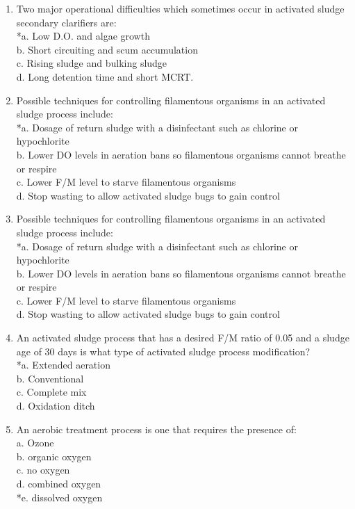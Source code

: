 \begin{enumerate}
\item Two major operational difficulties which sometimes occur in activated sludge secondary clarifiers are: \\
*a. Low D.O. and algae growth \\
b. Short circuiting and scum accumulation \\
c. Rising sludge and bulking sludge \\
d. Long detention time and short MCRT. \\


\item Possible techniques for controlling filamentous organisms in an activated sludge process include: \\
*a. Dosage of return sludge with a disinfectant such as chlorine or hypochlorite \\
b. Lower DO levels in aeration bans so filamentous organisms cannot breathe or respire \\
c. Lower F/M level to starve filamentous organisms \\
d. Stop wasting to allow activated sludge bugs to gain control \\

\item Possible techniques for controlling filamentous organisms in an activated sludge process include: \\
*a. Dosage of return sludge with a disinfectant such as chlorine or hypochlorite \\
b. Lower DO levels in aeration bans so filamentous organisms cannot breathe or respire \\
c. Lower F/M level to starve filamentous organisms \\
d. Stop wasting to allow activated sludge bugs to gain control \\

\item An activated sludge process that has a desired F/M ratio of 0.05 and a sludge age of 30 days is what type of activated sludge process modification? \\
*a. Extended aeration \\
b. Conventional \\
c. Complete mix \\
d. Oxidation ditch \\

\item An aerobic treatment process is one that requires the presence of: \\
a. Ozone \\
b. organic oxygen \\
c. no oxygen \\
d. combined oxygen \\
*e. dissolved oxygen \\


\end{enumerate}

